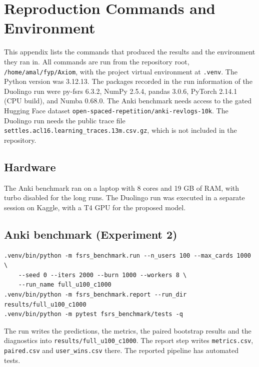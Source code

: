 
\chapter{Reproduction Commands and Environment}
\label{app:reproduction}

This appendix lists the commands that produced the results and the environment they ran in. All commands are
run from the repository root, \texttt{/home/amal/fyp/\allowbreak Axiom}, with the project virtual environment at \texttt{.venv}.
The Python version was 3.12.13. The packages recorded in the run information of the Duolingo run were
py-fsrs 6.3.2, NumPy 2.5.4, pandas 3.0.6, PyTorch 2.14.1 (CPU build), and Numba 0.68.0. The Anki benchmark
needs access to the gated Hugging Face dataset \texttt{open-spaced-repetition/\allowbreak anki-revlogs-10k}. The Duolingo run needs the
public trace file \texttt{settles.acl16.\allowbreak learning\_traces.13m.csv.gz}, which is not included in the repository.

\section{Hardware}

The Anki benchmark ran on a laptop with 8 cores and 19 GB of RAM, with turbo disabled for the long runs. The Duolingo run
was executed in a separate session on Kaggle, with a T4 GPU for the proposed model.

\section{Anki benchmark (Experiment 2)}

\begingroup\footnotesize\begin{verbatim}
.venv/bin/python -m fsrs_benchmark.run --n_users 100 --max_cards 1000 \
    --seed 0 --iters 2000 --burn 1000 --workers 8 \
    --run_name full_u100_c1000
.venv/bin/python -m fsrs_benchmark.report --run_dir results/full_u100_c1000
.venv/bin/python -m pytest fsrs_benchmark/tests -q
\end{verbatim}
\endgroup

The run writes the predictions, the metrics, the paired bootstrap results and the diagnostics into
\texttt{results/full\_u100\_c1000}. The report step writes \texttt{metrics.csv}, \texttt{paired.csv} and
\texttt{user\_wins.csv} there. The reported pipeline has \NumBenchTests{} automated tests.

